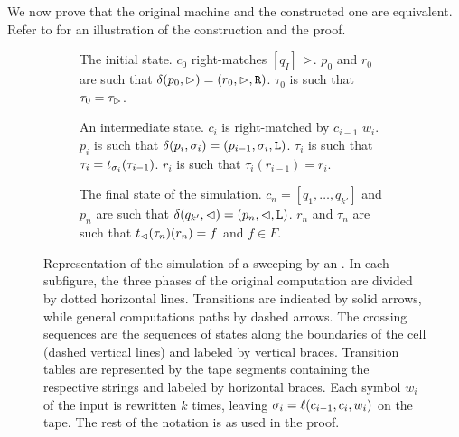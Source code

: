 We now prove that the original machine and the constructed one are equivalent.
Refer to  for an illustration of the construction and the proof.
\begin{figure}
	\centering
	\begin{subfigure}[b]{0.32\textwidth}
		\centering
		
		\caption{The initial state.
			$c_0$ right-matches $[q_I]$ \wrt $\rhd$.
			$p_0$ and $r_0$ are such that $\delta(p_0,\rhd)=(r_0,\rhd,\mathtt R)$.
			$\tau_0$ is such that $\tau_0=\tau_\rhd$.\newline}
	\end{subfigure}
	\hfill
	\begin{subfigure}[b]{0.32\textwidth}
		\centering
		
		\caption{An intermediate state.
			$c_i$ is right-matched by $c_{i-1}$ \wrt $w_i$.
			$p_i$ is such that $\delta(p_i,\sigma_i)=(p_{i-1},\sigma_i,\mathtt L)$.
			$\tau_i$ is such that $\tau_i=t_{\sigma_i}(\tau_{i-1})$.
			$r_i$ is such that $\tau_i(r_{i-1})=r_i$.}
	\end{subfigure}
	\hfill
	\begin{subfigure}[b]{0.33\textwidth}
		\centering
		
		\caption{The final state of the simulation.
		$c_n=[q_1,\dots,q_{k'}]$ and $p_n$ are such that $\delta(q_{k'},\lhd)=(p_n,\lhd,\mathtt L)$.
		$r_n$ and $\tau_n$ are such that $t_\lhd(\tau_n)(r_n)=f$ and $f\in F$.\newline}
	\end{subfigure}

	\caption{Representation of the simulation of a sweeping \kDLA by an \NFA.
		In each subfigure, the three phases of the original computation are divided by dotted horizontal lines.
		Transitions are indicated by solid arrows, while general computations paths by dashed arrows.
		The crossing sequences are the sequences of states along the boundaries of the cell (dashed vertical lines) and labeled by vertical braces.
		Transition tables are represented by the tape segments containing the respective strings and labeled by horizontal braces.
		Each symbol $w_i$ of the input is rewritten $k$ times, leaving $\sigma_i=\ell(c_{i-1},c_i,w_i)$ on the tape.
		The rest of the notation is as used in the proof.}
	\label{fig:swepkDLAtoNFA}
\end{figure}

